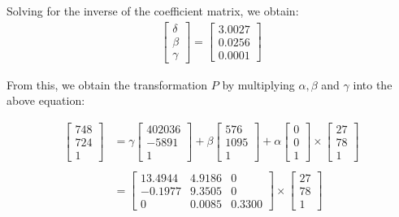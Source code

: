 \documentclass[12pt, oneside]{article}
\begin{document}
Solving for the inverse of the coefficient matrix, we obtain:
\begin{align*}
\begin{bmatrix}
\delta \\
\beta \\
\gamma
\end{bmatrix} = 
\begin{bmatrix}
3.0027    \\
0.0256   \\
0.0001
\end{bmatrix} 
\end{align*}
  
From this, we obtain the transformation $P$ by multiplying $\alpha, \beta$ and 
$\gamma$ into the above equation:

\begin{align*}
    \begin{bmatrix} 748   \\ 724   \\ 1   \end{bmatrix}  &= 
    \gamma  \begin{bmatrix} 402036  \\ -5891 \\ 1  \end{bmatrix} + 
    \beta \begin{bmatrix} 576   \\ 1095   \\   1   \end{bmatrix} + 
    \alpha \begin{bmatrix} 0   \\ 0   \\   1   \end{bmatrix} \times 
    \begin{bmatrix} 27 \\ 78 \\ 1  \end{bmatrix} \\ \\
    &= \begin{bmatrix}
    13.4944     &  4.9186   & 0 \\
    -0.1977     &  9.3505   & 0 \\
    0           & 0.0085  & 0.3300
    \end{bmatrix} \times 
    \begin{bmatrix} 27 \\ 78 \\ 1  \end{bmatrix} \\
\end{align*} 
\end{document}
